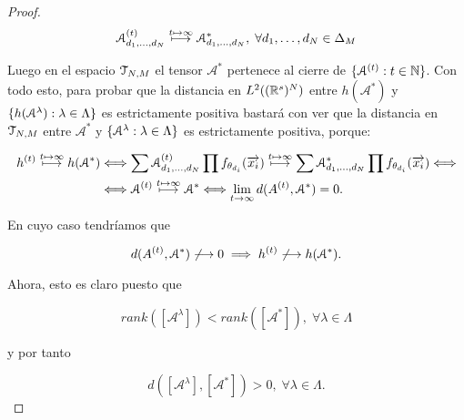 \begin{proof}
    \begin{equation}
        \mathcal{A}^{(t)}_{d_1, \ldots, d_N} \stackrel{t \mapsto \infty}{\longmapsto} \mathcal{A}^*_{d_1, \ldots, d_N},
        \; \forall d_1, \ldots, d_N \in \Delta_{M}
    \end{equation}

    Luego en el espacio $\mathcal{T}_{N, M}$ el tensor $\mathcal{A}^*$ pertenece al cierre de $\{ \mathcal{A}^{(t)}: t \in \mathbb{N} \}$. Con todo esto, para probar que la distancia en $L^2((\mathbb{R}^s)^N)$ entre $h(\mathcal{A}^*)$ y $\{ h(\mathcal{A}^\lambda): \lambda \in \Lambda \}$ es estrictamente positiva bastará con ver que la distancia en $\mathcal{T}_{N, M}$ entre $\mathcal{A}^*$ y $\{ \mathcal{A}^\lambda: \lambda \in \Lambda \}$ es estrictamente positiva, porque:

    \begin{equation}
    \begin{split}
        h^{(t)} \stackrel{t \mapsto \infty}{\longmapsto} h(\mathcal{A}^*) &\Longleftrightarrow \sum \mathcal{A}^{(t)}_{d_1, \ldots, d_N} \prod f_{\theta_{d_i}}(\overrightarrow{x_i}) \stackrel{t \mapsto \infty}{\longmapsto} \sum \mathcal{A}^*_{d_1, \ldots, d_N} \prod f_{\theta_{d_i}}(\overrightarrow{x_i}) \Longleftrightarrow \\
        &\Longleftrightarrow \mathcal{A}^{(t)} \stackrel{t \mapsto \infty}{\longmapsto} \mathcal{A}^* \Longleftrightarrow \lim_{t \to \infty} d(A^{(t)}, \mathcal{A}^*) = 0. \\
    \end{split}
    \end{equation}

    En cuyo caso tendríamos que

    \begin{equation}
        d(A^{(t)}, \mathcal{A}^*) \not\longrightarrow 0 \implies h^{(t)} \not\longrightarrow h(\mathcal{A}^*).
    \end{equation}

    Ahora, esto es claro puesto que

    \begin{equation}
        rank([\mathcal{A}^\lambda]) < rank([\mathcal{A}^*]),
        \; \forall \lambda \in \Lambda
    \end{equation}

    y por tanto

    \begin{equation}
        d([\mathcal{A}^\lambda], [\mathcal{A}^*]) > 0,
        \; \forall \lambda \in \Lambda.
    \end{equation}


\end{proof}
